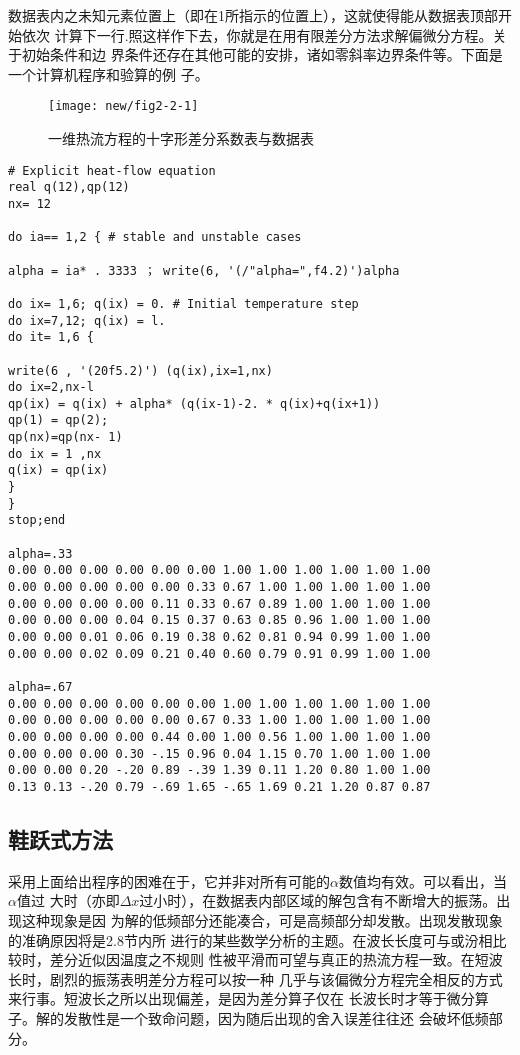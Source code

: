 数据表内之未知元素位置上（即在1所指示的位置上），这就使得能从数据表顶部开始依次
计算下一行.照这样作下去，你就是在用有限差分方法求解偏微分方程。关于初始条件和边
界条件还存在其他可能的安排，诸如零斜率边界条件等。下面是一个计算机程序和验算的例
子。
\begin{figure}[H]
\centering
\texttt{[image: new/fig2-2-1]}
\caption[fig2-2-1]{一维热流方程的十字形差分系数表与数据表}
\label{fig:new/fig2-2-1}
\end{figure}
\begin{verbatim}
# Explicit heat-flow equation
real q(12),qp(12)
nx= 12

do ia== 1,2 { # stable and unstable cases

alpha = ia* . 3333 ； write(6, '(/"alpha=",f4.2)')alpha

do ix= 1,6; q(ix) = 0. # Initial temperature step
do ix=7,12; q(ix) = l.
do it= 1,6 {

write(6 , '(20f5.2)') (q(ix),ix=1,nx)
do ix=2,nx-l
qp(ix) = q(ix) + alpha* (q(ix-1)-2. * q(ix)+q(ix+1))
qp(1) = qp(2);
qp(nx)=qp(nx- 1)
do ix = 1 ,nx
q(ix) = qp(ix)
}
}
stop;end

alpha=.33
0.00 0.00 0.00 0.00 0.00 0.00 1.00 1.00 1.00 1.00 1.00 1.00
0.00 0.00 0.00 0.00 0.00 0.33 0.67 1.00 1.00 1.00 1.00 1.00
0.00 0.00 0.00 0.00 0.11 0.33 0.67 0.89 1.00 1.00 1.00 1.00
0.00 0.00 0.00 0.04 0.15 0.37 0.63 0.85 0.96 1.00 1.00 1.00
0.00 0.00 0.01 0.06 0.19 0.38 0.62 0.81 0.94 0.99 1.00 1.00
0.00 0.00 0.02 0.09 0.21 0.40 0.60 0.79 0.91 0.99 1.00 1.00

alpha=.67
0.00 0.00 0.00 0.00 0.00 0.00 1.00 1.00 1.00 1.00 1.00 1.00
0.00 0.00 0.00 0.00 0.00 0.67 0.33 1.00 1.00 1.00 1.00 1.00
0.00 0.00 0.00 0.00 0.44 0.00 1.00 0.56 1.00 1.00 1.00 1.00
0.00 0.00 0.00 0.30 -.15 0.96 0.04 1.15 0.70 1.00 1.00 1.00
0.00 0.00 0.20 -.20 0.89 -.39 1.39 0.11 1.20 0.80 1.00 1.00
0.13 0.13 -.20 0.79 -.69 1.65 -.65 1.69 0.21 1.20 0.87 0.87
\end{verbatim}

\subsection{鞋跃式方法}
\label{sec:2.2.5}

采用上面给出程序的困难在于，它并非对所有可能的$\alpha$数值均有效。可以看出，当$\alpha$值过
大时（亦即$\Delta x$过小时），在数据表内部区域的解包含有不断增大的振荡。出现这种现象是因
为解的低频部分还能凑合，可是高频部分却发散。出现发散现象的准确原因将是2.8节内所
进行的某些数学分析的主题。在波长长度可与或汾相比较时，差分近似因温度之不规则
性被平滑而可望与真正的热流方程一致。在短波长时，剧烈的振荡表明差分方程可以按一种
几乎与该偏微分方程完全相反的方式来行事。短波长之所以出现偏差，是因为差分算子仅在
长波长时才等于微分算子。解的发散性是一个致命问题，因为随后出现的舍入误差往往还
会破坏低频部分。

